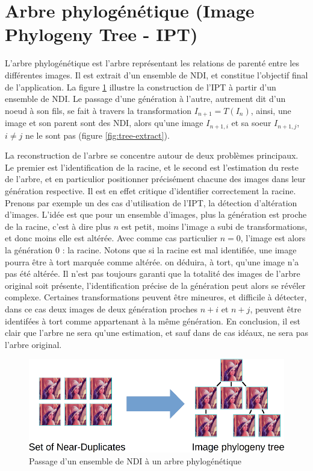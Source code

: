 \documentclass[utf8]{stageM2R} %
\begin{document}
\section{Arbre phylogénétique (Image Phylogeny Tree - IPT)}
L'arbre phylogénétique est l'arbre représentant les relations de parenté entre les différentes images. Il est extrait d'un ensemble de NDI, et constitue l'objectif final de l'application. La figure \ref{fig:set-to-tree} illustre la construction de l'IPT à partir d'un ensemble de NDI. Le passage d'une génération à l'autre, autrement dit d'un noeud à son fils, se fait à travers la transformation $I_{n+1} = T(I_{n})$, ainsi, une image et son parent sont des NDI, alors qu'une image $I_{n+1,i}$ et sa soeur $I_{n+1,j}$, $i \neq j$ ne le sont pas (figure \ref{fig:tree-extract}).

La reconstruction de l'arbre se concentre autour de deux problèmes principaux. Le premier est l'identification de la racine, et le second est l'estimation du reste de l'arbre, et en particulior positionner précisément chacune des images dans leur génération respective. Il est en effet critique d'identifier correctement la racine. Prenons par exemple un des cas d'utilisation de l'IPT, la détection d'altération d'images. L'idée est que pour un ensemble d'images, plus la génération est proche de la racine, c'est à dire plus $n$ est petit, moins l'image a subi de transformations, et donc moins elle est altérée. Avec comme cas particulier $n = 0$, l'image est alors la génération $0$ : la racine. Notons que si la racine est mal identifiée, une image pourra être à tort marquée comme altérée.
on déduira, à tort, qu'une image n'a pas été altérée. Il n'est pas toujours garanti que la totalité des images de l'arbre original soit présente, l'identification précise de la génération peut alors se révéler complexe. Certaines transformations peuvent être mineures, et difficile à détecter, dans ce cas deux images de deux génération proches $n+i$ et $n+j$, peuvent être identifées à tort comme appartenant à la même génération. En conclusion, il est clair que l'arbre ne sera qu'une estimation, et sauf dans de cas idéaux, ne sera pas l'arbre original.

\begin{figure}
  \begin{center}
    \includegraphics[width=120mm]{images/set_to_tree}
    \caption{Passage d'un ensemble de NDI à un arbre phylogénétique}
    \label{fig:set-to-tree}
  \end{center}
\end{figure}
\end{document}

